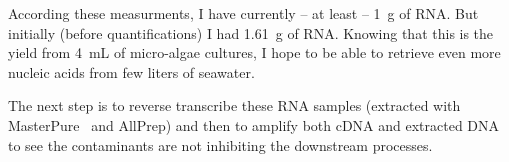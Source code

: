 According these measurments, I have currently -- at least -- 1~\textmu g of RNA. But initially (before quantifications) I had 1.61~\textmu g of RNA. Knowing that this is the yield from 4~mL of micro-algae cultures, I hope to be able to retrieve even more nucleic acids from few liters of seawater.

The next step is to reverse transcribe these RNA samples (extracted with MasterPure\texttrademark~ and AllPrep) and then to amplify both cDNA and extracted DNA to see the contaminants are not inhibiting the downstream processes.





